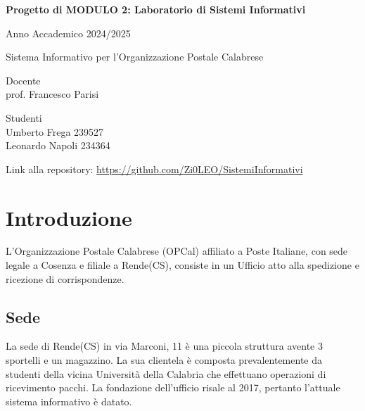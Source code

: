 
\author{Umberto Frega, Leonardo Napoli}
\setlength{\headheight}{15pt}
\setlength{\footskip}{47.5pt}
\addtolength{\topmargin}{-0.49998pt}

\fancyhf{}
\fancyfoot[L]{\thepage}
\fancyhead[R]{\theauthor}

\pagestyle{fancy}

\begin{titlepage}
  \centering
  {\Large \bfseries Progetto di MODULO 2: Laboratorio di Sistemi Informativi\par}
  {\Large Anno Accademico 2024/2025 \par}
  \vspace{1cm} %
  \vfill
  {\huge Sistema Informativo per l'Organizzazione Postale Calabrese\par}
  \vfill
  \noindent
  \begin{minipage}[t]{0.5\textwidth}
    \raggedright
    Docente \\  prof. Francesco Parisi
  \end{minipage}%
  \hfill
  \begin{minipage}[t]{0.4\textwidth}
    \raggedleft
    Studenti \\ Umberto Frega 239527 \\ Leonardo Napoli 234364
  \end{minipage}

\end{titlepage}
\newpage

Link alla repository: \href{https://github.com/Zi0LEO/SistemiInformativi}{https://github.com/Zi0LEO/SistemiInformativi}\\

\tableofcontents

\newpage
\section{Introduzione}
L'Organizzazione Postale Calabrese (OPCal) affiliato a Poste Italiane, con sede legale a Cosenza e filiale a Rende(CS), 
consiste in un Ufficio atto alla spedizione e ricezione di corrispondenze.
\subsection{Sede}
La sede di Rende(CS) in via Marconi, 11 è una piccola struttura avente 3 sportelli e un magazzino. La sua clientela è composta 
prevalentemente da studenti della vicina Università della Calabria che effettuano operazioni di ricevimento pacchi.
La fondazione dell'ufficio risale al 2017, pertanto l'attuale sistema informativo è datato.
